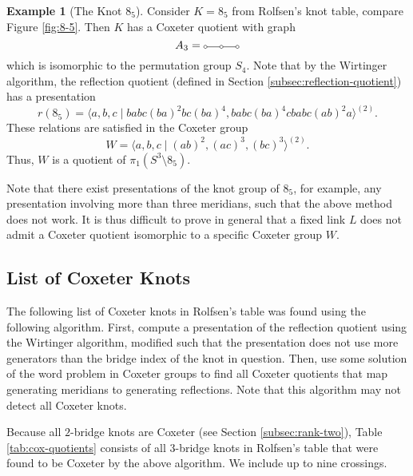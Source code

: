 \documentclass{article}
\theoremstyle{definition}
\newtheorem{example}[theorem]{Example}
\newcommand{\coxtwothreethree}{%
\begin{tikzpicture}[scale=0.5]
\draw (0, 0) circle (0.1);
\draw (1, 0) circle (0.1);
\draw (2, 0) circle (0.1);
\draw (0.1, 0) -- (0.9, 0);
\draw (1.1, 0) -- (1.9, 0);
\end{tikzpicture}}
\begin{document}
\begin{example}[The Knot $8_5$]
Consider $K = 8_5$ from Rolfsen's knot table, compare Figure \ref{fig:8-5}. Then $K$ has a Coxeter quotient with graph $$A_3 =\coxtwothreethree$$ which is isomorphic to the permutation group $S_4$.
Note that by the Wirtinger algorithm, the reflection quotient (defined in Section \ref{subsec:reflection-quotient}) has a presentation
$$r(8_5) = \langle a, b, c\; | \; babc(ba)^2bc(ba)^4, babc(ba)^4cbabc(ab)^2a \rangle^{(2)}.$$
These relations are satisfied in the Coxeter group
$$W = \langle a, b, c \; | \; (ab)^2, (ac)^3, (bc)^3 \rangle^{(2)}.$$
Thus, $W$ is a quotient of $\pi_1(S^3 \setminus 8_5)$.
\end{example}

Note that there exist presentations of the knot group of $8_5$, for example, any presentation involving more than three meridians, such that the above method does not work. It is thus difficult to prove in general that a fixed link $L$ does not admit a Coxeter quotient isomorphic to a specific Coxeter group $W$.



\subsection{List of Coxeter Knots}\label{subsec:list-of-quotients}
The following list of Coxeter knots in Rolfsen's table \cite{rolfsen2003} was found using the following algorithm. First, compute a presentation of the reflection quotient using the Wirtinger algorithm, modified such that the presentation does not use more generators than the bridge index of the knot in question. Then, use some solution of the word problem in Coxeter groups to find all Coxeter quotients that map generating meridians to generating reflections. Note that this algorithm may not detect all Coxeter knots.

Because all $2$-bridge knots are Coxeter (see Section \ref{subsec:rank-two}), Table \ref{tab:cox-quotients} consists of all $3$-bridge knots in Rolfsen's table that were found to be Coxeter by the above algorithm. We include up to nine crossings.
\end{document}
